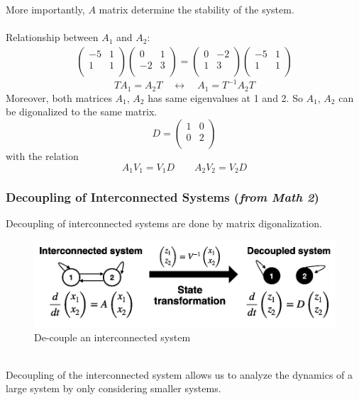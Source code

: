 More importantly, $A$ matrix determine the stability of the system.\\\\
Relationship between $A_{1}$ and $A_{2}$:
\begin{gather*}
\begin{pmatrix}
-5 & 1\\
1 & 1 \\
\end{pmatrix}
\begin{pmatrix}
0 & 1\\
-2 &3 \\
\end{pmatrix}
=
\begin{pmatrix}
0 & -2\\
1 &3 \\
\end{pmatrix}
\begin{pmatrix}
-5 & 1\\
1 & 1 \\
\end{pmatrix}
\end{gather*}
\[TA_{1} = A_{2}T \quad \leftrightarrow \quad A_{1}=T^{-1}A_{2}T\]
Moreover,  both matrices $A_{1}$, $A_{2}$ has same eigenvalues at 1 and 2. So $A_{1}$, $A_{2}$ can be digonalized to the same matrix.
\[D = \begin{pmatrix}
1 & 0\\
0 & 2\\
\end{pmatrix}
\]
with the relation
\[A_{1}V_{1} = V_{1}D \quad \quad A_{2}V_{2} = V_{2}D\]

\subsubsection{Decoupling of Interconnected Systems (\textit{from Math 2})}
Decoupling of interconnected systems are done by matrix digonalization. 
\begin{figure}[H] \centering
\includegraphics[width=.8\textwidth]{images/decouple.png}
\caption{De-couple an interconnected system}
\end{figure} \ \\
Decoupling of the interconnected system allows us to analyze the dynamics of a large system by only considering smaller systems.

